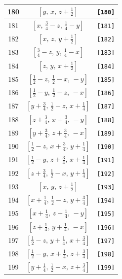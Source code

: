\documentclass[fleqn,8pt]{jsarticle}
\begin{document}
\begin{longtable}{ccc}
180 & $\left[ y,\, x,\, z + \frac{1}{2} \right]$ & {\tt [180]} \\ \hline
181 & $\left[ x,\, \frac{3}{4} - z,\, \frac{1}{4} - y \right]$ & {\tt [181]} \\ \hline
182 & $\left[ x,\, z,\, y + \frac{1}{2} \right]$ & {\tt [182]} \\ \hline
183 & $\left[ \frac{3}{4} - z,\, y,\, \frac{1}{4} - x \right]$ & {\tt [183]} \\ \hline
184 & $\left[ z,\, y,\, x + \frac{1}{2} \right]$ & {\tt [184]} \\ \hline
185 & $\left[ \frac{1}{2} - z,\, \frac{1}{2} - x,\, - y \right]$ & {\tt [185]} \\ \hline
186 & $\left[ \frac{1}{2} - y,\, \frac{1}{2} - z,\, - x \right]$ & {\tt [186]} \\ \hline
187 & $\left[ y + \frac{3}{4},\, \frac{1}{2} - z,\, x + \frac{1}{4} \right]$ & {\tt [187]} \\ \hline
188 & $\left[ z + \frac{3}{4},\, x + \frac{3}{4},\, - y \right]$ & {\tt [188]} \\ \hline
189 & $\left[ y + \frac{3}{4},\, z + \frac{3}{4},\, - x \right]$ & {\tt [189]} \\ \hline
190 & $\left[ \frac{1}{2} - z,\, x + \frac{3}{4},\, y + \frac{1}{4} \right]$ & {\tt [190]} \\ \hline
191 & $\left[ \frac{1}{2} - y,\, z + \frac{3}{4},\, x + \frac{1}{4} \right]$ & {\tt [191]} \\ \hline
192 & $\left[ z + \frac{3}{4},\, \frac{1}{2} - x,\, y + \frac{1}{4} \right]$ & {\tt [192]} \\ \hline
193 & $\left[ x,\, y,\, z + \frac{1}{2} \right]$ & {\tt [193]} \\ \hline
194 & $\left[ x + \frac{1}{4},\, \frac{1}{2} - z,\, y + \frac{3}{4} \right]$ & {\tt [194]} \\ \hline
195 & $\left[ x + \frac{1}{4},\, z + \frac{1}{4},\, - y \right]$ & {\tt [195]} \\ \hline
196 & $\left[ z + \frac{1}{4},\, y + \frac{1}{4},\, - x \right]$ & {\tt [196]} \\ \hline
197 & $\left[ \frac{1}{2} - z,\, y + \frac{1}{4},\, x + \frac{3}{4} \right]$ & {\tt [197]} \\ \hline
198 & $\left[ \frac{1}{2} - y,\, x + \frac{1}{4},\, z + \frac{3}{4} \right]$ & {\tt [198]} \\ \hline
199 & $\left[ y + \frac{1}{4},\, \frac{1}{2} - x,\, z + \frac{3}{4} \right]$ & {\tt [199]} \\ \hline

\end{longtable}
\end{document}
